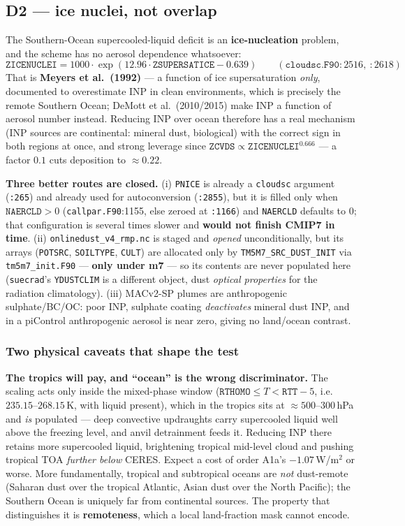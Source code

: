 \documentclass[10pt]{article}
\begin{document}
\subsection{D2 --- ice nuclei, not overlap}\label{sub:d2}
The Southern-Ocean supercooled-liquid deficit is an \textbf{ice-nucleation} problem, and the scheme has no
aerosol dependence whatsoever:
\[
\mathtt{ZICENUCLEI} = 1000\cdot\exp(12.96\cdot\mathtt{ZSUPERSATICE}-0.639)
\qquad(\texttt{cloudsc.F90}:2516,\ :2618)
\]
That is \textbf{Meyers et al.\ (1992)} --- a function of ice supersaturation \emph{only}, documented to
overestimate INP in clean environments, which is precisely the remote Southern Ocean; DeMott et al.\
(2010/2015) make INP a function of aerosol number instead. Reducing INP over ocean therefore has a real
mechanism (INP sources are continental: mineral dust, biological) with the correct sign in both regions at
once, and strong leverage since $\mathtt{ZCVDS}\propto\mathtt{ZICENUCLEI}^{0.666}$ --- a factor $0.1$ cuts
deposition to $\approx0.22$.

\textbf{Three better routes are closed.} (i) \texttt{PNICE} is already a \texttt{cloudsc} argument
(\texttt{:265}) and already used for autoconversion (\texttt{:2855}), but it is filled only when
$\mathtt{NAERCLD}>0$ (\texttt{callpar.F90}:1155, else zeroed at \texttt{:1166}) and \texttt{NAERCLD} defaults
to $0$; that configuration is several times slower and \textbf{would not finish CMIP7 in time}.
(ii) \texttt{onlinedust\_v4\_rmp.nc} is staged and \emph{opened} unconditionally, but its arrays
(\texttt{POTSRC}, \texttt{SOILTYPE}, \texttt{CULT}) are allocated only by \texttt{TM5M7\_SRC\_DUST\_INIT} via
\texttt{tm5m7\_init.F90} --- \textbf{only under m7} --- so its contents are never populated here
(\texttt{suecrad}'s \texttt{YDUSTCLIM} is a different object, dust \emph{optical properties} for the radiation
climatology). (iii) MACv2-SP plumes are anthropogenic sulphate/BC/OC: poor INP, sulphate coating
\emph{deactivates} mineral dust INP, and in a piControl anthropogenic aerosol is near zero, giving no
land/ocean contrast.

\subsubsection{Two physical caveats that shape the test}\label{sub:d2caveats}
\textbf{The tropics will pay, and ``ocean'' is the wrong discriminator.} The scaling acts only inside the
mixed-phase window ($\mathtt{RTHOMO}\le T<\mathtt{RTT}-5$, i.e.\ $235.15$--$268.15$\,K, with liquid present),
which in the tropics sits at $\approx500$--$300$\,hPa and \emph{is} populated --- deep convective updraughts
carry supercooled liquid well above the freezing level, and anvil detrainment feeds it. Reducing INP there
retains more supercooled liquid, brightening tropical mid-level cloud and pushing tropical TOA \emph{further
below} CERES. Expect a cost of order A1a's $-1.07$\,W/m$^2$ or worse. More fundamentally, tropical and
subtropical oceans are \emph{not} dust-remote (Saharan dust over the tropical Atlantic, Asian dust over the
North Pacific); the Southern Ocean is uniquely far from continental sources. The property that distinguishes it
is \textbf{remoteness}, which a local land-fraction mask cannot encode.
\end{document}
